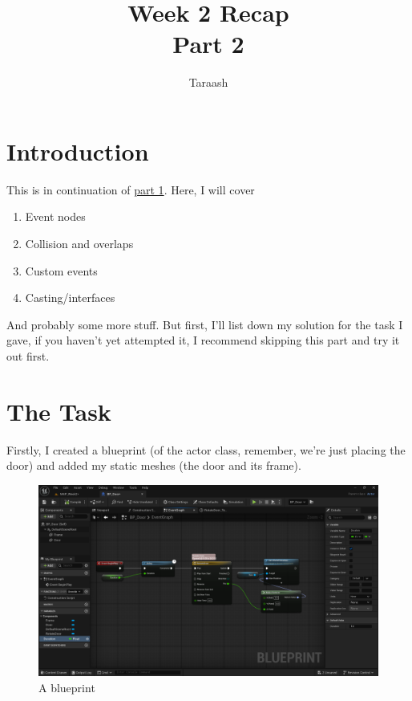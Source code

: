 \documentclass[]{article}
\title{Week 2 Recap \\ Part 2}
\author{Taraash}
\date{}
\begin{document}
	\maketitle
	
	\tableofcontents
	
	\newpage
	
	\section{Introduction}
	This is in continuation of \href{https://drive.google.com/file/d/1vT4dVOcDQfwohWIkxxJBOOMfCcRMoxMm/view?usp=sharing}{part 1}. Here, I will cover 
	\begin{enumerate}
		\item Event nodes
		\item Collision and overlaps
		\item Custom events
		\item Casting/interfaces
	\end{enumerate} 
	And probably some more stuff. But first, I'll list down my solution for the task I gave, if you haven't yet attempted it, I recommend skipping this part and try it out first.
	
	\section{The Task}
	Firstly, I created a blueprint (of the actor class, remember, we're just placing the door) and added my static meshes (the door and its frame).
	
	\begin{figure}[h]
		\centering
		\includegraphics[width=1\linewidth]{week2part2/screenshot001}
		\caption{A blueprint}
		\label{fig:screenshot001}
	\end{figure}
	
\end{document}
